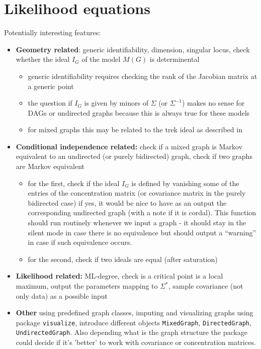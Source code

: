 \documentclass[11pt]{amsart}
\theoremstyle{definition}
\theoremstyle{remark}
\begin{document}
\section{Likelihood equations}


Potentially interesting features:
\begin{itemize}
\item \textbf{Geometry related}: generic identifiability, dimension, singular locus, check whether the ideal $I_G$ of the model $M(G)$ is determinental
\begin{itemize}
\item generic identifiability requires checking the rank of the Jacobian matrix at a generic point
\item the question if $I_G$ is given by minors of $\Sigma$ (or
  $\Sigma^{-1}$) makes no sense for DAGs or undirected graphs because
  this is always true for these models
\item for mixed graphs this may be related to the trek ideal as
  described in \cite{garcia2012graphical}
\end{itemize}
\item \textbf{Conditional independence related:} check if a mixed graph is Markov equivalent to an undirected (or purely bidirected) graph, check if two graphs are Markov equivalent
\begin{itemize}
\item for the first, check if the ideal $I_G$  is defined by vanishing some of the entries of the concentration matrix (or covariance matrix in the purely bidirected case) if yes, it would be nice to have as an output the corresponding undirected graph (with a note if it is cordal). This function should run routinely whenever we input a graph - it should stay in the silent mode in case there is no equivalence but should output a ``warning'' in case if such equivalence occurs.
\item for the second, check if two ideals are equal (after saturation)
\end{itemize}
\item \textbf{Likelihood related:} ML-degree, check is a critical point is a local maximum, output the parameters mapping to $\Sigma^*$, sample covariance (not only data) as a possible input
\item \textbf{Other} using predefined graph classes, imputing and visualizing graphs using package \texttt{visualize}, introduce different objects \texttt{MixedGraph}, \texttt{DirectedGraph}, \texttt{UndirectedGraph}. Also depending what is the graph structure the package could decide if it's 'better' to work with covariance or concentration matrices.
\end{itemize}
\end{document}
